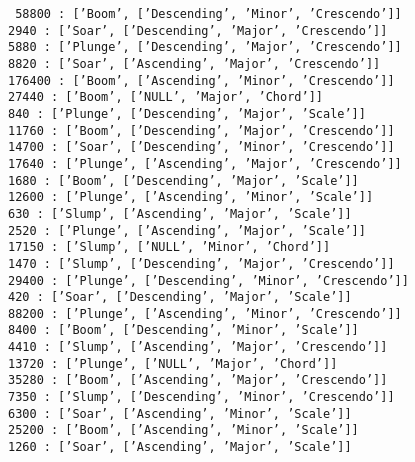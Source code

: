 \texttt{
58800   :  ['Boom', ['Descending', 'Minor', 'Crescendo']]\\
2940    :  ['Soar', ['Descending', 'Major', 'Crescendo']]\\
5880    :  ['Plunge', ['Descending', 'Major', 'Crescendo']]\\
8820    :  ['Soar', ['Ascending', 'Major', 'Crescendo']]\\
176400  :  ['Boom', ['Ascending', 'Minor', 'Crescendo']]\\
27440   :  ['Boom', ['NULL', 'Major', 'Chord']]\\
840     :  ['Plunge', ['Descending', 'Major', 'Scale']]\\
11760   :  ['Boom', ['Descending', 'Major', 'Crescendo']]\\
14700   :  ['Soar', ['Descending', 'Minor', 'Crescendo']]\\
17640   :  ['Plunge', ['Ascending', 'Major', 'Crescendo']]\\
1680    :  ['Boom', ['Descending', 'Major', 'Scale']]\\
12600   :  ['Plunge', ['Ascending', 'Minor', 'Scale']]\\
630     :  ['Slump', ['Ascending', 'Major', 'Scale']]\\
2520    :  ['Plunge', ['Ascending', 'Major', 'Scale']]\\
17150   :  ['Slump', ['NULL', 'Minor', 'Chord']]\\
1470    :  ['Slump', ['Descending', 'Major', 'Crescendo']]\\
29400   :  ['Plunge', ['Descending', 'Minor', 'Crescendo']]\\
420     :  ['Soar', ['Descending', 'Major', 'Scale']]\\
88200   :  ['Plunge', ['Ascending', 'Minor', 'Crescendo']]\\
8400    :  ['Boom', ['Descending', 'Minor', 'Scale']]\\
4410    :  ['Slump', ['Ascending', 'Major', 'Crescendo']]\\
13720   :  ['Plunge', ['NULL', 'Major', 'Chord']]\\
35280   :  ['Boom', ['Ascending', 'Major', 'Crescendo']]\\
7350    :  ['Slump', ['Descending', 'Minor', 'Crescendo']]\\
6300    :  ['Soar', ['Ascending', 'Minor', 'Scale']]\\
25200   :  ['Boom', ['Ascending', 'Minor', 'Scale']]\\
1260    :  ['Soar', ['Ascending', 'Major', 'Scale']]\\
}
